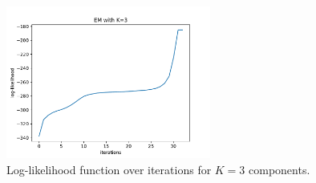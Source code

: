 \documentclass{article}
\begin{document}
\begin{figure}[!ht]
\centering
\includegraphics[width=0.6\textwidth]{./Figures/2_2_EM_likelihood_K3}
\caption{Log-likelihood function over iterations for $K=3$ components.}
\label{2_2_EM_likelihood}
\end{figure}
\end{document}
